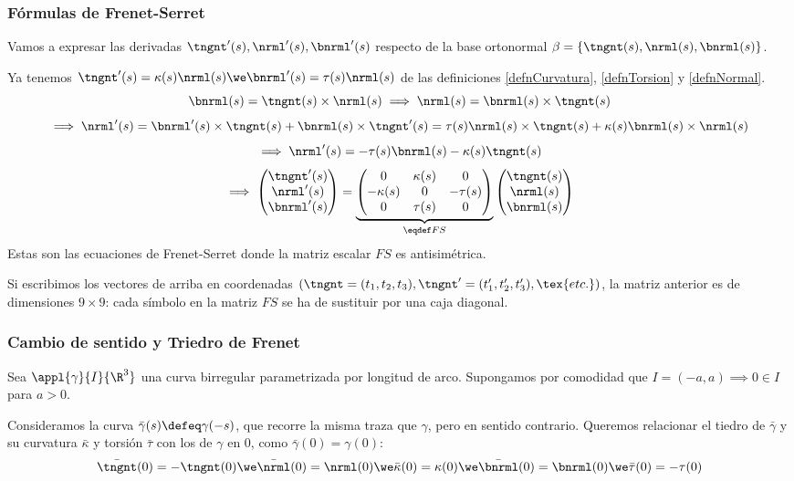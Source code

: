 \subsubsection{Fórmulas de Frenet-Serret}
Vamos a expresar las derivadas $\tngnt'(s), \nrml'(s), \bnrml'(s)$ respecto de la base ortonormal $\beta = \{\tngnt(s), \nrml(s), \bnrml(s)\}$.

Ya tenemos $\tngnt'(s) = \kappa(s)\nrml(s) \we \bnrml'(s)=\tau(s)\nrml(s)$ de las definiciones \ref{defnCurvatura}, \ref{defnTorsion} y \ref{defnNormal}.
\[\bnrml(s)=\tngnt(s)\times\nrml(s) \implies \nrml(s) = \bnrml(s)\times\tngnt(s)\]
\[\implies \nrml'(s)=\bnrml'(s)\times\tngnt(s) + \bnrml(s)\times\tngnt'(s) = \tau(s)\nrml(s)\times\tngnt(s) + \kappa(s)\bnrml(s)\times\nrml(s)\]
\[\implies \nrml'(s)=-\tau(s)\bnrml(s)-\kappa(s)\tngnt(s)\]
\[\implies \begin{pmatrix}
	\tngnt'(s) \\ \nrml'(s) \\ \bnrml'(s)
\end{pmatrix} = \underbrace{\begin{pmatrix}
	0 & \kappa(s) & 0 \\
	-\kappa(s) & 0 & -\tau(s) \\
	0 & \tau(s) & 0
\end{pmatrix}}_{\eqdef FS}\begin{pmatrix}
	\tngnt(s) \\ \nrml(s) \\ \bnrml(s)
\end{pmatrix}\]
Estas son las ecuaciones de Frenet-Serret donde la matriz escalar $FS$ es antisimétrica.

Si escribimos los vectores de arriba en coordenadas $(\tngnt=(t_1, t_2, t_3), \tngnt'=(t_1', t_2', t_3'), \tex{ etc.})$, la matriz anterior es de dimensiones $9\times9$: cada símbolo en la matriz $FS$ se ha de sustituir por una caja diagonal.

\subsubsection{Cambio de sentido y Triedro de Frenet}
Sea $\appl{\gamma}{I}{\R^3}$ una curva birregular parametrizada por longitud de arco. Supongamos por comodidad que $I = (-a, a) \implies 0\in I$ para $a>0$.

Consideramos la curva $\bar{\gamma}(s)\defeq\gamma(-s)$, que recorre la misma traza que $\gamma$, pero en sentido contrario. Queremos relacionar el tiedro de $\bar{\gamma}$ y su curvatura $\bar{\kappa}$ y torsión $\bar{\tau}$ con los de $\gamma$ en $0$, como $\bar{\gamma} (0)=\gamma(0)$:
\[\bar{\tngnt}(0)=-\tngnt(0) \we \bar{\nrml}(0)=\nrml(0) \we \bar{\kappa}(0)=\kappa(0) \we \bar{\bnrml}(0)=\bnrml(0) \we \bar{\tau}(0)=-\tau(0)\] 

